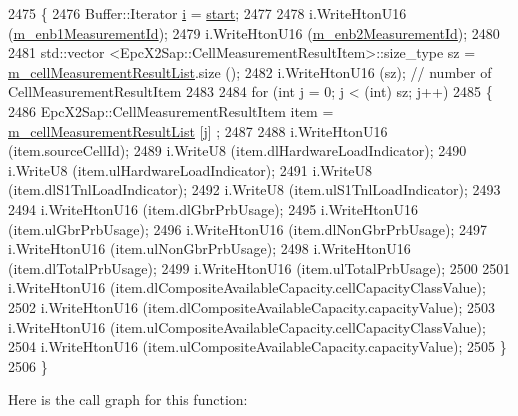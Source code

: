 \begin{DoxyCode}
2475 \{
2476   Buffer::Iterator \hyperlink{bernuolliDistribution_8m_a6f6ccfcf58b31cb6412107d9d5281426}{i} = \hyperlink{namespacevisualizer_1_1core_a2a35e5d8a34af358b508dac8635754e0}{start};
2477 
2478   i.WriteHtonU16 (\hyperlink{classns3_1_1EpcX2ResourceStatusUpdateHeader_a060867e7063bf2f4870a92fb87c57a68}{m\_enb1MeasurementId});
2479   i.WriteHtonU16 (\hyperlink{classns3_1_1EpcX2ResourceStatusUpdateHeader_a26cddb3363d7aa29c0c87347a09feeab}{m\_enb2MeasurementId});
2480 
2481   std::vector <EpcX2Sap::CellMeasurementResultItem>::size\_type sz = 
      \hyperlink{classns3_1_1EpcX2ResourceStatusUpdateHeader_abab9be68f01115061ce10d519fa925ab}{m\_cellMeasurementResultList}.size ();
2482   i.WriteHtonU16 (sz);              \textcolor{comment}{// number of CellMeasurementResultItem}
2483 
2484   \textcolor{keywordflow}{for} (\textcolor{keywordtype}{int} j = 0; j < (int) sz; j++)
2485     \{
2486       EpcX2Sap::CellMeasurementResultItem item = \hyperlink{classns3_1_1EpcX2ResourceStatusUpdateHeader_abab9be68f01115061ce10d519fa925ab}{m\_cellMeasurementResultList} [j]
      ;
2487 
2488       i.WriteHtonU16 (item.sourceCellId);
2489       i.WriteU8 (item.dlHardwareLoadIndicator);
2490       i.WriteU8 (item.ulHardwareLoadIndicator);
2491       i.WriteU8 (item.dlS1TnlLoadIndicator);
2492       i.WriteU8 (item.ulS1TnlLoadIndicator);
2493 
2494       i.WriteHtonU16 (item.dlGbrPrbUsage);
2495       i.WriteHtonU16 (item.ulGbrPrbUsage);
2496       i.WriteHtonU16 (item.dlNonGbrPrbUsage);
2497       i.WriteHtonU16 (item.ulNonGbrPrbUsage);
2498       i.WriteHtonU16 (item.dlTotalPrbUsage);
2499       i.WriteHtonU16 (item.ulTotalPrbUsage);
2500 
2501       i.WriteHtonU16 (item.dlCompositeAvailableCapacity.cellCapacityClassValue);
2502       i.WriteHtonU16 (item.dlCompositeAvailableCapacity.capacityValue);
2503       i.WriteHtonU16 (item.ulCompositeAvailableCapacity.cellCapacityClassValue);
2504       i.WriteHtonU16 (item.ulCompositeAvailableCapacity.capacityValue);
2505     \}
2506 \}
\end{DoxyCode}


Here is the call graph for this function\+:


